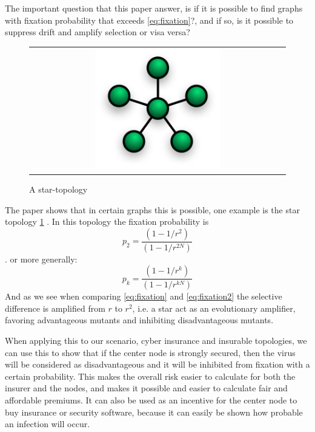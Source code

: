 The important question that this paper answer, is if it is possible to find graphs with fixation probability that exceeds \ref{eq:fixation}?, and if so, is it possible to suppress drift and amplify selection or visa versa?
\begin{figure}
\centering
\begin{tabular}{@{}c@{}}
\includegraphics[width=0.5\textwidth]{NetworkTopology-Star.png}
\end{tabular}
\caption{\label{fig:star} A star-topology \cite{lieberman2005evolutionary}}
\end{figure}
The paper shows that in certain graphs this is possible, one example is the star topology \ref{fig:star} .
In this topology the fixation probability is\begin{equation}p_{2}=\frac{(1-1/r^{2})}{(1-1/r^{2N})} \label{eq:fixation2} \end{equation}.
or more generally: \begin{equation}
p_{k}=\frac{(1-1/r^{k})}{(1-1/r^{kN})} \label{eq:fixationk}
\end{equation}
And as we see when comparing \ref{eq:fixation} and \ref{eq:fixation2} the selective difference is
 amplified from $r$ to $r^{2}$, i.e. a star act as an evolutionary amplifier, favoring advantageous
  mutants and inhibiting disadvantageous mutants.
  
When applying this to our scenario, cyber insurance and insurable topologies, we can use this to show
 that if the center node is strongly secured, then the virus will be considered as disadvantageous and
it will be inhibited from fixation with a certain probability. 
This makes the overall risk easier to calculate for both the insurer and the nodes,
and makes it possible and easier to calculate fair and affordable premiums. 
It can also be used as an incentive for the center node to buy insurance or security software, 
because it can easily be shown how probable an infection will occur. 

